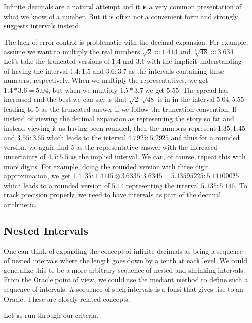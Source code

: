 \documentclass[12pt]{article}
\theoremstyle{remark}
\begin{document}
Infinite decimals are a natural attempt and it is a very common presentation of what we know of a number. But it is often not a convenient form and strongly suggests intervals instead. 

The lack of error control is problematic with the decimal expansion. For example, assume we want to multiply the real numbers $\sqrt{2} \approx 1.414$ and $\sqrt[3]{48}\approx 3.634$. Let's take the truncated versions of 1.4 and 3.6 with the implicit understanding of having the interval $1.4:1.5$ and $3.6:3.7$ as the intervals containing these numbers, respectively. When we multiply the representatives, we get $1.4*3.6 = 5.04$, but when we multiply $1.5*3.7$ we get $5.55$. The spread has increased and the best we can say is that $\sqrt{2} \sqrt[3]{48}$ is in in the interval $5.04:5.55$ leading to $5$ as the truncated answer if we follow the truncation convention. If instead of viewing the decimal expansion as representing the story so far and instead viewing it as having been rounded, then the numbers represent $1.35:1.45$ and $3.55 :3.65$ which leads to the interval $4.7925: 5.2925$ and thus for a rounded version, we again find $5$ as the representative answer with the increased uncertainty of $4.5:5.5$ as the implied interval. We can, of course, repeat this with more digits. For example, doing the rounded version with three digit approximation, we get $1.4135:1.4145\otimes 3.6335:3.6345 = 5.13595225:5.14100025$ which leads to a rounded version of $5.14$ representing the interval $5.135:5.145$. To track precision properly, we need to have intervals as part of the decimal arithmetic. 


\subsection{Nested Intervals}

One can think of expanding the concept of infinite decimals as being a sequence of nested intervals where the length goes down by a tenth at each level. We could generalize this to be a more arbitrary sequence of nested and shrinking intervals. From the Oracle point of view, we could use the mediant method to define such a sequence of intervals. A sequence of such intervals is a fonsi that gives rise to an Oracle. These are closely related concepts. 

Let us run through our criteria. 
\end{document}

